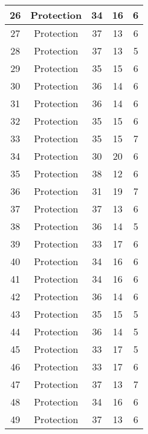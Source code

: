 \documentclass[results.tex]{subfiles}
\begin{document}
\begin{center}
\begin{tabular}{| c || c | c | c | c |}
    \hline
    26 & Protection & 34 & 16 & 6 \\ 
    \hline
    27 & Protection & 37 & 13 & 6 \\ 
    \hline
    28 & Protection & 37 & 13 & 5 \\ 
    \hline
    29 & Protection & 35 & 15 & 6 \\ 
    \hline
    30 & Protection & 36 & 14 & 6 \\ 
    \hline
    31 & Protection & 36 & 14 & 6 \\ 
    \hline
    32 & Protection & 35 & 15 & 6 \\ 
    \hline
    33 & Protection & 35 & 15 & 7 \\ 
    \hline
    34 & Protection & 30 & 20 & 6 \\ 
    \hline
    35 & Protection & 38 & 12 & 6 \\ 
    \hline
    36 & Protection & 31 & 19 & 7 \\ 
    \hline
    37 & Protection & 37 & 13 & 6 \\ 
    \hline
    38 & Protection & 36 & 14 & 5 \\ 
    \hline
    39 & Protection & 33 & 17 & 6 \\ 
    \hline
    40 & Protection & 34 & 16 & 6 \\ 
    \hline
    41 & Protection & 34 & 16 & 6 \\ 
    \hline
    42 & Protection & 36 & 14 & 6 \\ 
    \hline
    43 & Protection & 35 & 15 & 5 \\ 
    \hline
    44 & Protection & 36 & 14 & 5 \\ 
    \hline
    45 & Protection & 33 & 17 & 5 \\ 
    \hline
    46 & Protection & 33 & 17 & 6 \\ 
    \hline
    47 & Protection & 37 & 13 & 7 \\ 
    \hline
    48 & Protection & 34 & 16 & 6 \\ 
    \hline
    49 & Protection & 37 & 13 & 6 \\ 
    \hline   \end{tabular}
\end{center}
\end{document}
